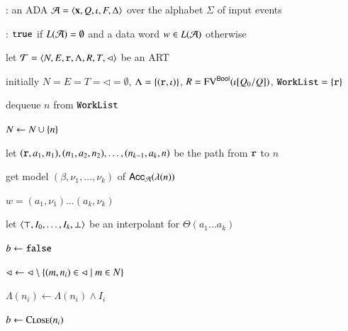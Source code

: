 \documentclass[10pt]{llncs}
\begin{document}
\begin{algorithm}[t!]
{\scriptsize\begin{algorithmic}[0]
  : an ADA $\mathcal{A} = \left\langle \mathbf x,Q,\iota,F,\Delta \right\rangle$
  over the alphabet $\Sigma$ of input events

  : $\mathtt{true}$ if $L(\mathcal{A})=\emptyset$ and a data word $w
  \in L(\mathcal{A})$ otherwise
\end{algorithmic}}

{\scriptsize\begin{algorithmic}[1] 

  \State let $\mathcal{T} = \left\langle N,E,\mathtt{r},\Lambda,R,T,\lhd \right\rangle$ be an ART

  \State initially $N = E = T = \lhd = \emptyset$, $\Lambda =
  \left\{ (\mathtt{r},\iota) \right\}$, $R = \mathrm{FV}^{\mathsf{Bool}}(\iota[Q_0/Q])$,
  $\mathtt{WorkList}=\left\{ \mathtt{r} \right\}$
  
  \While{$\worklist \neq \emptyset$}
  \label{ln:impact-while}

  \State dequeue $n$ from $\mathtt{WorkList}$ 
  \label{ln:impact-dequeue}

  \State $N \leftarrow N \cup \left\{ n \right\}$

  \State let $(\mathtt{r},a_1,n_1),(n_1,a_2,n_2), \ldots,
  (n_{k-1},a_k,n)$ be the path from $\mathtt{r}$ to $n$


  \State get model $(\beta,\nu_1,\ldots,\nu_k)$ of
  $\mathsf{Acc}_{\mathcal{A}}(\lambda(n))$

   $w = (a_1,\nu_1) \ldots (a_k,\nu_k)$
  \label{ln:impact-nonempty}

  \Else {}

  \State let $\left\langle \top,I_0,\ldots,I_k,\bot \right\rangle$ be an interpolant for
  $\Theta(a_1 \ldots a_k)$
  \label{ln:refine-begin}

  \State $b \leftarrow \mathtt{false}$


  \label{ln:entailment1}

  \State $\lhd \leftarrow \lhd \setminus \left\{ (m,n_i) \in \lhd \mid m \in N \right\}$

  \State $\Lambda(n_i) \leftarrow \Lambda(n_i) \wedge I_i$


  \State $b \leftarrow \Call{Close}{n_i}$
  \label{ln:refine-end}


\end{algorithmic}}
\end{algorithm}
\end{document}
